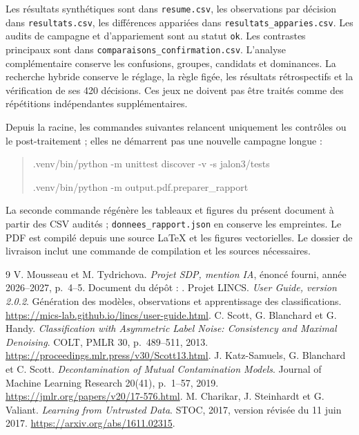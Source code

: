 \documentclass[11pt,a4paper]{article}
\begin{document}
Les résultats synthétiques sont dans \texttt{resume.csv}, les observations
par décision dans \texttt{resultats.csv}, les différences appariées dans
\texttt{resultats\_apparies.csv}. Les audits de campagne et d'appariement sont
au statut \texttt{ok}. Les contrastes principaux sont dans
\texttt{comparaisons\_confirmation.csv}. L'analyse complémentaire conserve les
confusions, groupes, candidats et dominances. La recherche hybride conserve
le réglage, la règle figée, les résultats rétrospectifs et la vérification de
ses 420 décisions. Ces jeux ne doivent pas être traités comme des répétitions
indépendantes supplémentaires.

Depuis la racine, les commandes suivantes relancent uniquement les contrôles
ou le post-traitement ; elles ne démarrent pas une nouvelle campagne longue :
\begin{quote}\small\ttfamily
.venv/bin/python -m unittest discover -v -s jalon3/tests\par
.venv/bin/python -m output.pdf.preparer\_rapport
\end{quote}
La seconde commande régénère les tableaux et figures du présent document à
partir des CSV audités ; \texttt{donnees\_rapport.json} en conserve les empreintes.
Le PDF est compilé depuis une source LaTeX et les figures vectorielles. Le
dossier de livraison inclut une commande de compilation et les sources nécessaires.

\begin{thebibliography}{9}
 V. Mousseau et M. Tydrichova.
\emph{Projet SDP, mention IA}, énoncé fourni, année 2026--2027,
p.~4--5. Document du dépôt : .
 Projet LINCS.
\emph{User Guide, version 2.0.2}. Génération des modèles, observations et
apprentissage des classifications.
\url{https://mics-lab.github.io/lincs/user-guide.html}.
 C. Scott, G. Blanchard et G. Handy.
\emph{Classification with Asymmetric Label Noise: Consistency and Maximal
Denoising}. COLT, PMLR 30, p.~489--511, 2013.
\url{https://proceedings.mlr.press/v30/Scott13.html}.
 J. Katz-Samuels, G. Blanchard et C. Scott.
\emph{Decontamination of Mutual Contamination Models}. Journal of Machine
Learning Research 20(41), p.~1--57, 2019.
\url{https://jmlr.org/papers/v20/17-576.html}.
 M. Charikar, J. Steinhardt et G. Valiant.
\emph{Learning from Untrusted Data}. STOC, 2017, version révisée du 11 juin 2017.
\url{https://arxiv.org/abs/1611.02315}.
\end{thebibliography}
\end{document}
